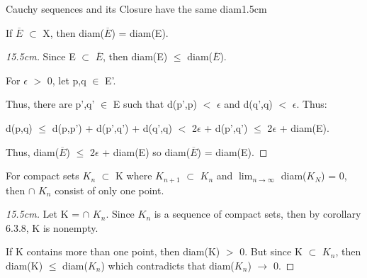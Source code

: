     \begin{ltheorem}{Cauchy sequences and its Closure have the same diam}{1.5cm}
        \item If $\overline{E}$ $\subset$ X, then diam($\overline{E}$) = diam(E).
        
            \begin{proof}[15.5cm]
                Since E $\subset$ $\overline{E}$, then
                diam(E) $\leq$ diam($\overline{E}$).

                For $\epsilon$ $>$ 0, let p,q $\in$ E'.

                Thus, there are p',q' $\in$ E such that
                d(p',p) $<$ $\epsilon$ and d(q',q) $<$ $\epsilon$.
                Thus:

                d(p,q) $\leq$ d(p,p') + d(p',q') + d(q',q)
                $<$ 2$\epsilon$ + d(p',q')
                $\leq$ 2$\epsilon$ + diam(E).

                Thus, diam($\overline{E}$) $\leq$ 2$\epsilon$ + diam(E)
                so diam($\overline{E}$) = diam(E).                
            \end{proof}

        \item For compact sets $K_n$ $\subset$ K where $K_{n+1}$ $\subset$ $K_n$
            and $\lim_{n \rightarrow \infty}$ diam($K_N$) = 0,
            then $\cap$ $K_n$ consist of only one point.

            \begin{proof}[15.5cm]
                Let K = $\cap$ $K_n$.
                Since $K_n$ is a sequence of compact sets, then
                by {\color{orange} corollary 6.3.8}, K is nonempty.

                If K contains more than one point, then diam(K) $>$ 0.
                But since K $\subset$ $K_n$, then diam(K) $\leq$ diam($K_n$)
                which contradicts that diam($K_n$) $\rightarrow$ 0.
            \end{proof}
    \end{ltheorem}

    \vspace{0.5cm}



